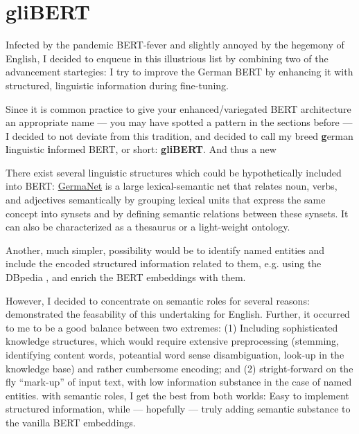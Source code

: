 \section{gliBERT}

Infected by the pandemic BERT-fever and slightly annoyed by the hegemony of English, I decided to
enqueue in this illustrious list by combining two of the {\color{red} advancement startegies}: I try to improve
the German BERT by enhancing it with structured, linguistic information during fine-tuning.

Since it is common practice to give your enhanced/variegated BERT architecture an appropriate name --- you may have spotted
a pattern in the sections before --- I decided to not deviate from this tradition, and decided to call my breed
\textbf{g}erman \textbf{l}inguistic \textbf{i}nformed BERT, or short: \textbf{gliBERT}.
And thus a new

There exist several linguistic structures which could be hypothetically included into BERT:
\href{https://uni-tuebingen.de/en/faculties/faculty-of-humanities/departments/modern-languages/department-of-linguistics/chairs/general-and-computational-linguistics/ressources/lexica/germanet/}{GermaNet} \citep{hamp1997germanet}
is a large lexical-semantic net that relates noun, verbs, and adjectives semantically by
grouping lexical units that express the same concept into synsets and by defining semantic
relations between these synsets. It can also be characterized as a thesaurus or a light-weight
ontology.

Another, much simpler, possibility would be to identify named entities
and include the encoded structured
information related to them, e.g. using the DBpedia \citep{auer2007dbpedia}, and enrich
the BERT embeddings with them.

However, I decided to concentrate on semantic roles for several reasons: \citeauthor{zhang2019semantics}
demonstrated the feasability of this undertaking for English. Further, it occurred to me to be a good
balance between two extremes: (1) Including sophisticated knowledge structures, which would
require extensive preprocessing (stemming, identifying content words, poteantial word sense
disambiguation, look-up in the knowledge base) and rather cumbersome encoding; and (2)
stright-forward on the fly ``mark-up'' of input text, with low information substance in the
case of named entities. with semantic roles, I get the best from both worlds: Easy to implement
structured information, while --- hopefully --- truly adding semantic substance to the vanilla
BERT embeddings.



